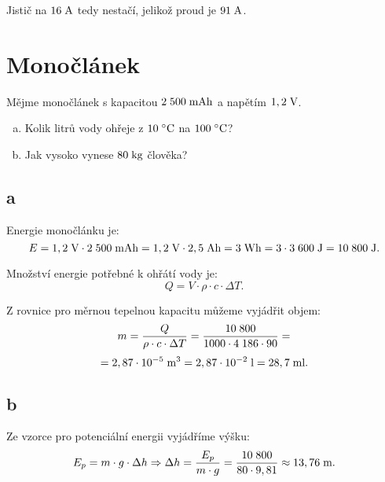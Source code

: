\documentclass{article}
\begin{document}
Jistič na $16 \; \textrm{A}$ tedy nestačí, jelikož proud je $91 \; \textrm{A}$.

\newpage




\section{ Monočlánek \spicy}
Mějme monočlánek s kapacitou $2 \; 500 \; \textrm{mAh}$ a napětím $1,2 \; \textrm{V}$.
\begin{enumerate}[a)]
    \item Kolik litrů vody ohřeje z $10 \; ^\circ \textrm{C}$ na $100 \; ^\circ \textrm{C}$?
    \item Jak vysoko vynese $80 \; \textrm{kg}$ člověka?
\end{enumerate}



\subsection{a}
Energie monočlánku je:
$$
    E = 1,2 \; \textrm{V} \cdot 2 \; 500 \; \textrm{mAh} = 1,2 \; \textrm{V} \cdot 2,5 \; \textrm{Ah} = 3 \; \textrm{Wh} = 3 \cdot 3 \; 600 \; \textrm{J} = 10 \; 800 \; \textrm{J}.
$$

Množství energie potřebné k ohřátí vody je:
$$
    Q = V \cdot \rho \cdot c \cdot \Delta T.
$$

Z rovnice pro měrnou tepelnou kapacitu můžeme vyjádřit objem:
$$
    m = \frac{Q}{\rho \cdot c \cdot \Delta T} = \frac{10 \; 800}{1 000 \cdot 4 \; 186 \cdot 90} =
$$
$$
    = 2,87 \cdot 10^{-5} \; \textrm{m}^{\textrm{3}} = 2,87 \cdot 10^{-2} \; \textrm{l} = 28,7 \; \textrm{ml}.
$$



\subsection{b}
Ze vzorce pro potenciální energii vyjádříme výšku:
$$
    E_p = m \cdot g \cdot \Delta h \Rightarrow \Delta h = \frac{E_p}{m \cdot g} = \frac{10 \; 800}{80 \cdot 9,81} \approx 13,76 \; \textrm{m}.
$$
\end{document}
